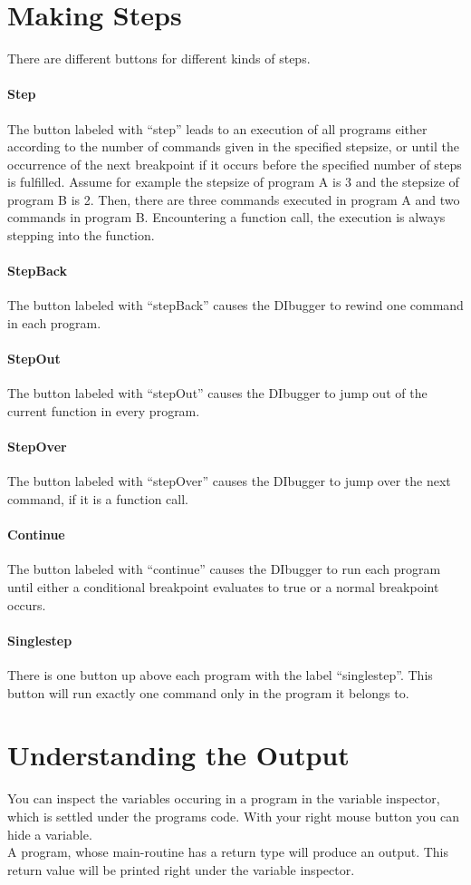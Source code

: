 \documentclass[parskip=full]{memoir}
\begin{document}
\section{Making Steps}
There are different buttons for different kinds of steps.
\paragraph{Step}
The button labeled with \enquote{step} leads to an execution of all programs either according to the number of commands given in the specified stepsize, or until the occurrence of the next breakpoint if it occurs before the specified number of steps is fulfilled. Assume for example the stepsize of program A is 3 and the stepsize of program B is 2. Then, there are three commands executed in program A and two commands in program B. Encountering a function call, the execution is always stepping into the function.
\paragraph{StepBack}
The button labeled with \enquote{stepBack} causes the DIbugger to rewind one command in each program.
\paragraph{StepOut}
The button labeled with \enquote{stepOut} causes the DIbugger to jump out of the current function in every program.
\paragraph{StepOver}
The button labeled with \enquote{stepOver} causes the DIbugger to jump over the next command, if it is a function call.
\paragraph{Continue}
The button labeled with \enquote{continue} causes the DIbugger to run each program until either a conditional breakpoint evaluates to true or a normal breakpoint occurs.
\paragraph{Singlestep}
There is one button up above each program with the label \enquote{singlestep}. This button will run exactly one command only in the program it belongs to.
\section{Understanding the Output}
You can inspect the variables occuring in a program in the variable inspector, which is settled under the programs code. With your right mouse button you can hide a variable.\\
A program, whose main-routine has a return type will produce an output. 
This return value will be printed right under the variable inspector.
\end{document}
